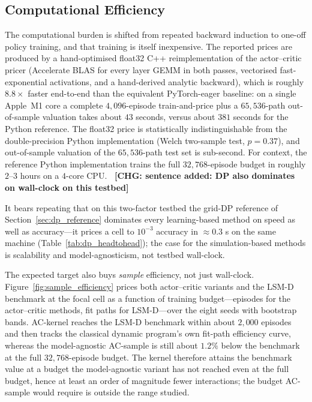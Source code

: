 \documentclass[a4paper,fleqn]{cas-dc}
\newcommand{\hlblock}[1]{\par\noindent
    \colorbox{chgyellow}{\parbox{\dimexpr\linewidth-2\fboxsep\relax}{#1}}\par}
\newcommand{\hlblock}[1]{#1}
\newcommand{\chg}[1]{{\normalfont\bfseries\color{red}~[CHG: \textsf{\footnotesize #1}]~}}
\newcommand{\chg}[1]{}
\begin{document}
\subsection{Computational Efficiency}

The computational burden is shifted from repeated backward induction to one-off policy training, and that training is itself inexpensive. The reported prices are produced by a hand-optimised float32 C++ reimplementation of the actor--critic pricer (Accelerate BLAS for every layer GEMM in both passes, vectorised fast-exponential activations, and a hand-derived analytic backward), which is roughly $8.8\times$ faster end-to-end than the equivalent PyTorch-eager baseline: on a single Apple~M1 core a complete $4{,}096$-episode train-and-price plus a $65{,}536$-path out-of-sample valuation takes about $43$ seconds, versus about $381$ seconds for the Python reference. The float32 price is statistically indistinguishable from the double-precision Python implementation (Welch two-sample test, $p=0.37$), and out-of-sample valuation of the $65{,}536$-path test set is sub-second. For context, the reference Python implementation trains the full $32{,}768$-episode budget in roughly $2$--$3$ hours on a $4$-core CPU.
\chg{sentence added: DP also dominates on wall-clock on this testbed}%
\hlblock{It bears repeating that on this two-factor testbed the grid-DP reference of Section~\ref{sec:dp_reference} dominates every learning-based method on speed as well as accuracy---it prices a cell to $10^{-3}$ accuracy in $\approx 0.3$ s on the same machine (Table~\ref{tab:dp_headtohead}); the case for the simulation-based methods is scalability and model-agnosticism, not testbed wall-clock.}

The expected target also buys \emph{sample} efficiency, not just wall-clock. Figure~\ref{fig:sample_efficiency} prices both actor--critic variants and the LSM-D benchmark at the focal cell as a function of training budget---episodes for the actor--critic methods, fit paths for LSM-D---over the eight seeds with bootstrap bands. AC-kernel reaches the LSM-D benchmark within about $2{,}000$ episodes and then tracks the classical dynamic program's own fit-path efficiency curve, whereas the model-agnostic AC-sample is still about $1.2\%$ below the benchmark at the full $32{,}768$-episode budget. The kernel therefore attains the benchmark value at a budget the model-agnostic variant has not reached even at the full budget, hence at least an order of magnitude fewer interactions; the budget AC-sample would require is outside the range studied.
\end{document}
